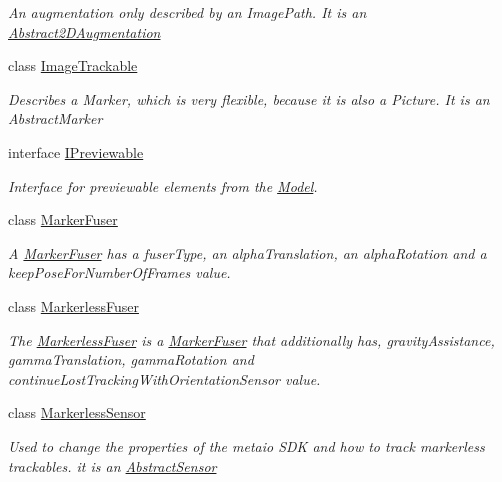 \begin{DoxyCompactItemize}
\begin{DoxyCompactList}\small\item\em An augmentation only described by an Image\-Path. It is an \hyperlink{class_a_rdev_kit_1_1_model_1_1_project_1_1_abstract2_d_augmentation}{Abstract2\-D\-Augmentation} \end{DoxyCompactList}\item 
class \hyperlink{class_a_rdev_kit_1_1_model_1_1_project_1_1_image_trackable}{Image\-Trackable}
\begin{DoxyCompactList}\small\item\em Describes a Marker, which is very flexible, because it is also a Picture. It is an Abstract\-Marker \end{DoxyCompactList}\item 
interface \hyperlink{interface_a_rdev_kit_1_1_model_1_1_project_1_1_i_previewable}{I\-Previewable}
\begin{DoxyCompactList}\small\item\em Interface for previewable elements from the \hyperlink{namespace_a_rdev_kit_1_1_model}{Model}. \end{DoxyCompactList}\item 
class \hyperlink{class_a_rdev_kit_1_1_model_1_1_project_1_1_marker_fuser}{Marker\-Fuser}
\begin{DoxyCompactList}\small\item\em A \hyperlink{class_a_rdev_kit_1_1_model_1_1_project_1_1_marker_fuser}{Marker\-Fuser} has a fuser\-Type, an alpha\-Translation, an alpha\-Rotation and a keep\-Pose\-For\-Number\-Of\-Frames value. \end{DoxyCompactList}\item 
class \hyperlink{class_a_rdev_kit_1_1_model_1_1_project_1_1_markerless_fuser}{Markerless\-Fuser}
\begin{DoxyCompactList}\small\item\em The \hyperlink{class_a_rdev_kit_1_1_model_1_1_project_1_1_markerless_fuser}{Markerless\-Fuser} is a \hyperlink{class_a_rdev_kit_1_1_model_1_1_project_1_1_marker_fuser}{Marker\-Fuser} that additionally has, gravity\-Assistance, gamma\-Translation, gamma\-Rotation and continue\-Lost\-Tracking\-With\-Orientation\-Sensor value. \end{DoxyCompactList}\item 
class \hyperlink{class_a_rdev_kit_1_1_model_1_1_project_1_1_markerless_sensor}{Markerless\-Sensor}
\begin{DoxyCompactList}\small\item\em Used to change the properties of the metaio S\-D\-K and how to track markerless trackables. it is an \hyperlink{class_a_rdev_kit_1_1_model_1_1_project_1_1_abstract_sensor}{Abstract\-Sensor} \end{DoxyCompactList}\item 

\end{DoxyCompactItemize}
